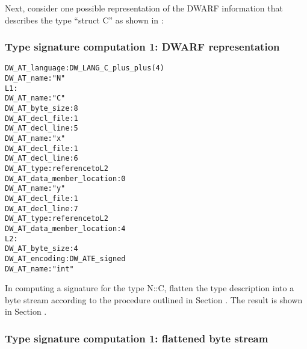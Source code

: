 Next, consider one possible representation of the DWARF
information that describes the type “struct C” as shown
in 
:

\subsubsection{Type signature  computation 1: DWARF representation}
\label{app:typesignaturecomputation1dwarfrepresentation}
\begin{alltt}
      DW\-\_AT\-\_language: DW\-\_LANG\-\_C\-\_plus\-\_plus (4)
        DW\-\_AT\-\_name : "N"
L1:
          DW\-\_AT\-\_name : "C"
          DW\-\_AT\-\_byte\-\_size : 8
          DW\-\_AT\-\_decl\-\_file : 1
          DW\-\_AT\-\_decl\-\_line : 5
            DW\-\_AT\-\_name : "x"
            DW\-\_AT\-\_decl\-\_file : 1
            DW\-\_AT\-\_decl\-\_line : 6
            DW\-\_AT\-\_type : reference to L2
            DW\-\_AT\-\_data\-\_member\-\_location : 0
            DW\-\_AT\-\_name : "y"
            DW\-\_AT\-\_decl\-\_file : 1
            DW\-\_AT\-\_decl\-\_line : 7
            DW\-\_AT\-\_type : reference to L2
            DW\-\_AT\-\_data\-\_member\-\_location : 4
L2:
         DW\-\_AT\-\_byte\-\_size : 4
         DW\-\_AT\-\_encoding : DW\-\_ATE\-\_signed
         DW\-\_AT\-\_name : "int"
\end{alltt}

In computing a signature for the type N::C, flatten the type
description into a byte stream according to the procedure
outlined in 
Section .
The result is shown in 
Section .

\subsubsection{Type signature  computation 1: flattened byte stream}
\label{app:typesignaturecomputation1flattenedbytestream}

